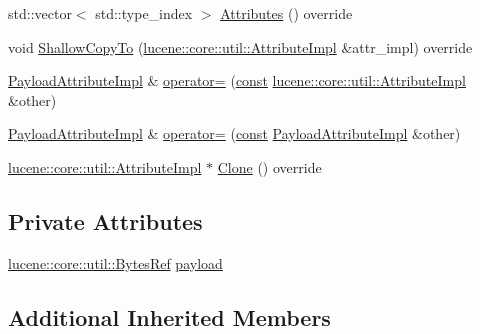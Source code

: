 \begin{DoxyCompactItemize}
\item 
std\+::vector$<$ std\+::type\+\_\+index $>$ \mbox{\hyperlink{classlucene_1_1core_1_1analysis_1_1tokenattributes_1_1PayloadAttributeImpl_a1f7dbb8afdd42ca827dc6e077445071b}{Attributes}} () override
\item 
void \mbox{\hyperlink{classlucene_1_1core_1_1analysis_1_1tokenattributes_1_1PayloadAttributeImpl_ae1104df0b599fd494620e2bce9d39b6c}{Shallow\+Copy\+To}} (\mbox{\hyperlink{classlucene_1_1core_1_1util_1_1AttributeImpl}{lucene\+::core\+::util\+::\+Attribute\+Impl}} \&attr\+\_\+impl) override
\item 
\mbox{\hyperlink{classlucene_1_1core_1_1analysis_1_1tokenattributes_1_1PayloadAttributeImpl}{Payload\+Attribute\+Impl}} \& \mbox{\hyperlink{classlucene_1_1core_1_1analysis_1_1tokenattributes_1_1PayloadAttributeImpl_a82dd546c2275107d47d6a152cd43d04e}{operator=}} (\mbox{\hyperlink{ZlibCrc32_8h_a2c212835823e3c54a8ab6d95c652660e}{const}} \mbox{\hyperlink{classlucene_1_1core_1_1util_1_1AttributeImpl}{lucene\+::core\+::util\+::\+Attribute\+Impl}} \&other)
\item 
\mbox{\hyperlink{classlucene_1_1core_1_1analysis_1_1tokenattributes_1_1PayloadAttributeImpl}{Payload\+Attribute\+Impl}} \& \mbox{\hyperlink{classlucene_1_1core_1_1analysis_1_1tokenattributes_1_1PayloadAttributeImpl_ac5a8e038064f6ee8774df0708467201f}{operator=}} (\mbox{\hyperlink{ZlibCrc32_8h_a2c212835823e3c54a8ab6d95c652660e}{const}} \mbox{\hyperlink{classlucene_1_1core_1_1analysis_1_1tokenattributes_1_1PayloadAttributeImpl}{Payload\+Attribute\+Impl}} \&other)
\item 
\mbox{\hyperlink{classlucene_1_1core_1_1util_1_1AttributeImpl}{lucene\+::core\+::util\+::\+Attribute\+Impl}} $\ast$ \mbox{\hyperlink{classlucene_1_1core_1_1analysis_1_1tokenattributes_1_1PayloadAttributeImpl_a5ec30ffd50c79e22ba0166b0e47629b3}{Clone}} () override
\end{DoxyCompactItemize}
\subsection*{Private Attributes}
\begin{DoxyCompactItemize}
\item 
\mbox{\hyperlink{classlucene_1_1core_1_1util_1_1BytesRef}{lucene\+::core\+::util\+::\+Bytes\+Ref}} \mbox{\hyperlink{classlucene_1_1core_1_1analysis_1_1tokenattributes_1_1PayloadAttributeImpl_ac5bd28a25a555ffb21b75fda1036def1}{payload}}
\end{DoxyCompactItemize}
\subsection*{Additional Inherited Members}


